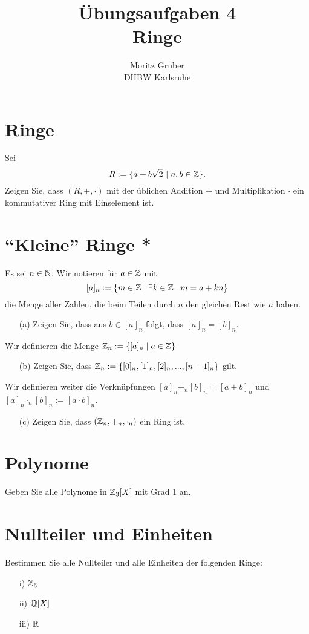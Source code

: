 \documentclass[
				a4paper,
				10pt
			]
			{scrartcl}
\author{Moritz Gruber\\ DHBW Karlsruhe}
\title{\"Ubungsaufgaben 4\\ 
	Ringe
}
\date{}
\begin{document}
\maketitle

\section{Ringe}

Sei
$$
	R := \{ a + b\sqrt{2} ~|~a,b \in \mathbb{Z} \}. 
$$
Zeigen Sie, dass $(R,+,\cdot)$ mit der \"ublichen Addition $+$ und Multiplikation $\cdot$ ein kommutativer Ring mit Einselement ist.

\section{``Kleine'' Ringe *}
Es sei $n \in \mathbb{N}$. Wir notieren f\"ur $a \in \mathbb{Z}$ mit
$$
[a]_n:=\{m \in \mathbb{Z} \mid \exists k\in \mathbb{Z}: m=a+kn\}
$$
die Menge aller Zahlen, die beim Teilen durch $n$ den gleichen Rest wie $a$ haben.

\begin{itemize}
\item[(a)] Zeigen Sie, dass aus $b \in [a]_n$ folgt, dass $[a]_n=[b]_n$.
\end{itemize}
Wir definieren die Menge
$
\mathbb{Z}_n := \{[a]_n \mid a \in \mathbb{Z}\}
$
\begin{itemize}
\item[(b)] Zeigen Sie, dass $\mathbb{Z}_n:=\{[0]_n,[1]_n,[2]_n,...,[n-1]_n\}$ gilt.
\end{itemize}
Wir definieren weiter die Verkn\"upfungen $[a]_n+_n[b]_n=[a+b]_n$ und $[a]_n\cdot_n [b]_n:=[a\cdot b]_n$.
\begin{itemize}
\item[(c)] Zeigen Sie, dass $(\mathbb{Z}_n,+_n,\cdot_n)$ ein Ring ist.
\end{itemize}



\section{Polynome}

Geben Sie alle Polynome in $\mathbb{Z}_3[X]$ mit Grad $1$ an. 

\section{Nullteiler und Einheiten}
Bestimmen Sie alle Nullteiler und alle Einheiten der folgenden Ringe:
\begin{itemize}
\item[i)] $\mathbb{Z}_6$
\item[ii)] $\mathbb{Q}[X]$
\item[iii)] $\mathbb{R}$
\end{itemize}
\end{document}
